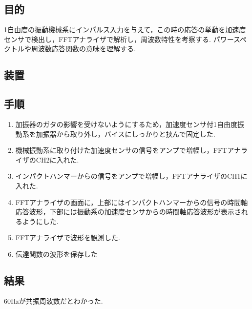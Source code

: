 \documentclass[twocolumn, 10pt,a4j]{jsarticle}
\begin{document}
        \subsection{目的}
            1自由度の振動機械系にインパルス入力を与えて，この時の応答の挙動を加速度センサで検出し，FFTアナライザで解析し，周波数特性を考察する.
            パワースペクトルや周波数応答関数の意味を理解する.
        \subsection{装置}
        \subsection{手順}
          \begin{enumerate}
            \item 加振器のガタの影響を受けないようにするため，加速度センサ付1自由度振動系を加振器から取り外し，バイスにしっかりと挟んで固定した.
            \item 機械振動系に取り付けた加速度センサの信号をアンプで増幅し，FFTアナライザのCH2に入れた.
            \item インパクトハンマーからの信号をアンプで増幅し，FFTアナライザのCH1に入れた.
            \item FFTアナライザの画面に，上部にはインパクトハンマーからの信号の時間軸応答波形，下部には振動系の加速度センサからの時間軸応答波形が表示されるようにした.
            \item FFTアナライザで波形を観測した.
            \item 伝達関数の波形を保存した
          \end{enumerate}
        \subsection{結果}
          60Hzが共振周波数だとわかった.
\end{document}
